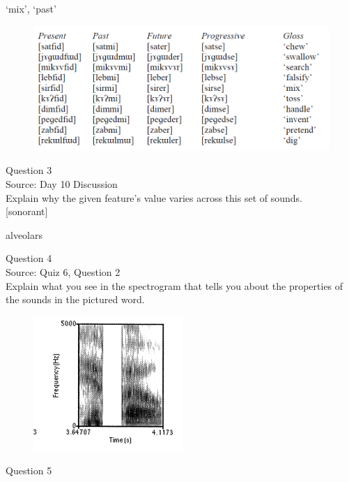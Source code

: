 \documentclass[12pt]{article}
\begin{document}
`mix', `past'

\begin{figure}[H]
\includegraphics{../images/final_dataset.png}
\end{figure}

\newpage

{\large Question 3}\\

Source: Day 10 Discussion\\

Explain why the given feature's value varies across this set of sounds.\\

{[sonorant]}

alveolars


\newpage

{\large Question 4}\\

Source: Quiz 6, Question 2\\

Explain what you see in the spectrogram that tells you about the properties of the sounds in the pictured word.\\

\begin{figure}[H]
\includegraphics{../images/spectrogram_hippo.png}
\end{figure}

\newpage

{\large Question 5}\\
\end{document}
